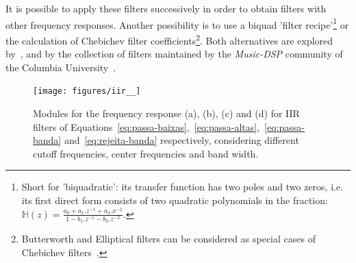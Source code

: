 It is possible to apply these filters successively in order to obtain filters with other frequency responses. Another possibility is to use a biquad 'filter recipe'\footnote{Short for 'biquadratic': its transfer function has two poles and two zeros, i.e. its first direct form consists of two quadratic polynomials in the fraction: $\mathbb{H}(z)=\frac{a_0+a_1.z^{-1}+a_2.x^{-2}}{1- b_1.z^{-1} -b_2 . z^{-2}}$.} or the calculation of Chebichev filter coefficients\footnote{Butterworth and Elliptical filters can be considered as special cases of Chebichev filters~\cite{Openheim,smith}.}.
Both alternatives are explored by~\cite{JOSFM,smith}, and by the collection of filters maintained by the \emph{Music-DSP} community of the Columbia University~\cite{music-dsp,Openheim}.

\begin{figure}
    \centering
        \texttt{[image: figures/iir\_\_]}
    \caption{Modules for the frequency response (a), (b), (c) and (d) for IIR filters of Equations~\ref{eq:passa-baixas},~\ref{eq:passa-altas},~\ref{eq:passa-banda} and~\ref{eq:rejeita-banda} respectively, considering different cutoff frequencies, center frequencies and band width.}
        \label{fig:iir}
\end{figure}

